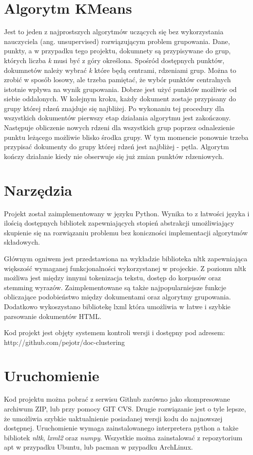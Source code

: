 \documentclass{article}
\begin{document}
\section{Algorytm KMeans}
Jest to jeden z najprostszych algorytmów uczących się bez wykorzystania nauczyciela (ang. unsupervised) rozwiązującym problem grupowania. Dane, punkty, a w przypadku tego projektu, dokumnety są przypisywane do grup, których liczba \emph{k} musi być z góry określona. Spośród dostępnych punktów, dokumnetów należy wybrać \emph{k} które będą centrami, rdzeniami grup. Można to zrobić w sposób losowy, ale trzeba pamiętać, że wybór punktów centralnych istotnie wpływa na wynik grupowania. Dobrze jest użyć punktów możliwie od siebie oddalonych. W kolejnym kroku, każdy dokument zostaje przypisany do grupy której rdzeń znajduje się najbliżej. Po wykonaniu tej procedury dla wszystkich dokumentów pierwszy etap działania algorytmu jest zakończony. Następuje obliczenie nowych rdzeni dla wszystkich grup poprzez odnalezienie punktu leżącego możliwie blisko środka grupy. W tym momencie ponownie trzeba przypisać dokumenty do grupy której rdzeń jest najbliżej - pętla. Algorytm kończy działanie kiedy nie obserwuje się już zmian punktów rdzeniowych.

\section{Narzędzia}
Projekt został zaimplementowany w języku Python. Wynika to z łatwości języka i ilością dostępnych bibliotek zapewniających stopień abstrakcji umożliwiający skupienie się na rozwiązaniu problemu bez koniczności implementacji algorytmów składowych.

Głównym ogniwem jest przedstawiona na wykładzie biblioteka nltk zapewniająca większość wymaganej funkcjonalności wykorzystanej w projeckie. Z poziomu nltk możliwa jest między innymi tokenizacja tekstu, dostęp do korpusów oraz stemming wyrazów. Zaimplementowane są także najpopularniejsze funkcje obliczające podobieństwo między dokumentami oraz algorytmy grupowania. Dodatkowo wykoszystano bibliotekę lxml która umożliwia w łatwe i szybkie parsowanie dokumentów HTML.

Kod projekt jest objęty systemem kontroli wersji i dostępny pod adresem: http://github.com/pejotr/doc-clustering

\section{Uruchomienie}
Kod projektu można pobrać z serwisu Github zarówno jako skompresowane archiwum ZIP, lub przy pomocy GIT CVS. Drugie rozwiązanie jest o tyle lepsze, że umożliwia szybkie uaktualnienie posiadanej wersji kodu do najnowszej dostępnej. Uruchomienie wymaga zainstalowanego interpretera python a także bibliotek \emph{nltk}, \emph{lxml2} oraz \emph{numpy}. Wszystkie można zainstalować z repozytorium apt w przypadku Ubuntu, lub pacman w pzypadku ArchLinux.
\end{document}
